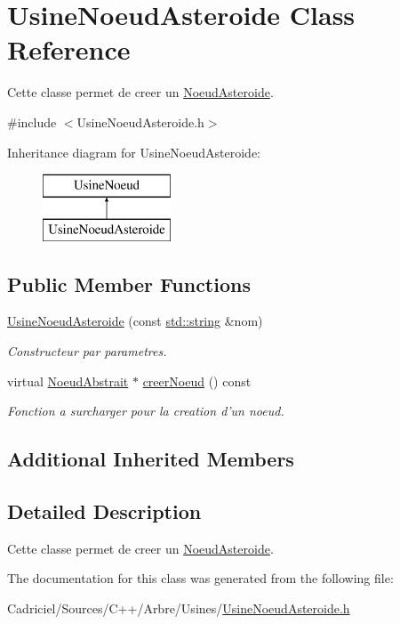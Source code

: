 \hypertarget{class_usine_noeud_asteroide}{\section{Usine\-Noeud\-Asteroide Class Reference}
\label{class_usine_noeud_asteroide}
}


Cette classe permet de creer un \hyperlink{class_noeud_asteroide}{Noeud\-Asteroide}.  




{\ttfamily \#include $<$Usine\-Noeud\-Asteroide.\-h$>$}

Inheritance diagram for Usine\-Noeud\-Asteroide\-:\begin{figure}[H]
\begin{center}
\leavevmode
\includegraphics[height=2.000000cm]{class_usine_noeud_asteroide}
\end{center}
\end{figure}
\subsection*{Public Member Functions}
\begin{DoxyCompactItemize}
\item 
\hyperlink{group__inf2990_gad56a23460b8dd5d59b678bca856e80ca}{Usine\-Noeud\-Asteroide} (const \hyperlink{glew_8h_ae84541b4f3d8e1ea24ec0f466a8c568b}{std\-::string} \&nom)
\begin{DoxyCompactList}\small\item\em Constructeur par parametres. \end{DoxyCompactList}\item 
virtual \hyperlink{class_noeud_abstrait}{Noeud\-Abstrait} $\ast$ \hyperlink{group__inf2990_gab6be7e595c0cfed194ec12d49aca928a}{creer\-Noeud} () const 
\begin{DoxyCompactList}\small\item\em Fonction a surcharger pour la creation d'un noeud. \end{DoxyCompactList}\end{DoxyCompactItemize}
\subsection*{Additional Inherited Members}


\subsection{Detailed Description}
Cette classe permet de creer un \hyperlink{class_noeud_asteroide}{Noeud\-Asteroide}. 

The documentation for this class was generated from the following file\-:\begin{DoxyCompactItemize}
\item 
Cadriciel/\-Sources/\-C++/\-Arbre/\-Usines/\hyperlink{_usine_noeud_asteroide_8h}{Usine\-Noeud\-Asteroide.\-h}\end{DoxyCompactItemize}
